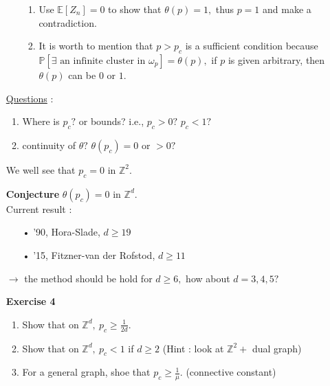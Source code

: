 \documentclass[12pt,a4paper]{report}
\theoremstyle{definition}
\begin{document}
\begin{enumerate}
\begin{enumerate}
\begin{enumerate}
	        \item Use $\mathbb{E}[Z_n]=0$ to show that $\theta(p)=1,$ thus $p=1$ and make a contradiction.
	        \item It is worth to mention that $p>p_c$ is a sufficient condition because \\$\mathbb{P}[\exists\mbox{ an infinite cluster in }\omega_p]=\theta(p),$ if $p$ is given arbitrary, then $\theta(p)$ can be $0$ or $1.$
	    \end{enumerate}
	\end{enumerate}
	\item[\underline{Questions} :]\begin{enumerate}
		\item Where is $p_c?$ or bounds? i.e., $p_c>0?$ $p_c<1?$
		\item continuity of $\theta?$ $\theta(p_c)=0$ or $>0?$
	\end{enumerate}
	We well see that $p_c=0$ in $\mathbb{Z}^2.$
	\item[\textbf{Conjecture}] $\theta(p_c)=0$ in $\mathbb{Z}^d$.\\
	Current result :
	\begin{enumerate}
		\item[•] '90, Hora-Slade, $d\geq 19$
		\item[•] '15, Fitzner-van der Rofstod, $d\geq 11$
	\end{enumerate}
	$\rightarrow$ the method should be hold for $d\geq 6,$ how about $d=3,4,5?$
	\item[\textbf{Exercise 4}] \begin{enumerate}
		\item Show that on $\mathbb{Z}^d,\ p_c\geq \frac{1}{2d}.$
		\item Show that on $\mathbb{Z}^d,\ p_c<1$ if $d\geq 2$ (Hint : look at $\mathbb{Z}^2+$ dual graph)
		\item For a general graph, shoe that $p_c\geq \frac{1}{\mu}.$ (connective constant)
	\end{enumerate}
\end{enumerate}
\newpage
\end{document}
